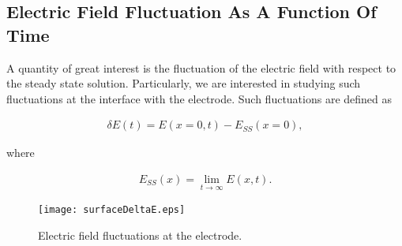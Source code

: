 \newpage
\subsection{Electric Field Fluctuation As A Function Of Time}


A quantity of great interest is the fluctuation of the electric field with respect to the steady state solution. Particularly, we are interested in studying such fluctuations at the interface with the electrode. Such fluctuations are defined as

\begin{align}
	\delta E(t) = E(x=0, t) - E_{SS}(x=0), 
\end{align}

where 

\begin{align}
	E_{SS}(x) = \lim_{t\rightarrow\infty} E(x,t).
\end{align}



\begin{figure}[htbp]
\centering
\texttt{[image: surfaceDeltaE.eps]}
\caption{Electric field fluctuations at the electrode.}
\label{fig:nernts-no-field}
\end{figure}


\newpage



